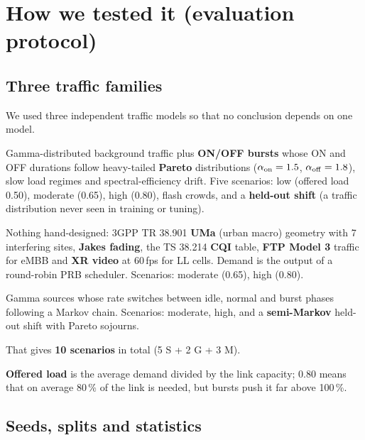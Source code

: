 \documentclass[11pt,a4paper]{article}
\begin{document}
\section{How we tested it (evaluation protocol)}

\subsection{Three traffic families}

We used three independent traffic models so that no conclusion depends on one model.
\begin{description}[leftmargin=0.5cm,style=nextline]
  \item[Family S (synthetic, bursty)] Gamma-distributed background traffic plus \textbf{ON/OFF bursts} whose ON and OFF durations follow heavy-tailed \textbf{Pareto} distributions ($\alpha_{\rm on} = 1.5$, $\alpha_{\rm off} = 1.8$), slow load regimes and spectral-efficiency drift. Five scenarios: low (offered load 0.50), moderate (0.65), high (0.80), flash crowds, and a \textbf{held-out shift} (a traffic distribution never seen in training or tuning).
  \item[Family G (3GPP, standards-based)] Nothing hand-designed: 3GPP TR 38.901 \textbf{UMa} (urban macro) geometry with 7 interfering sites, \textbf{Jakes fading}, the TS 38.214 \textbf{CQI} table, \textbf{FTP Model 3} traffic for eMBB and \textbf{XR video} at 60\,fps for LL cells. Demand is the output of a round-robin PRB scheduler. Scenarios: moderate (0.65), high (0.80).
  \item[Family M (Markov-modulated)] Gamma sources whose rate switches between idle, normal and burst phases following a Markov chain. Scenarios: moderate, high, and a \textbf{semi-Markov} held-out shift with Pareto sojourns.
\end{description}
That gives \textbf{10 scenarios} in total (5 S + 2 G + 3 M).

\textbf{Offered load} is the average demand divided by the link capacity; 0.80 means that on average 80\,\% of the link is needed, but bursts push it far above 100\,\%.

\subsection{Seeds, splits and statistics}
\end{document}

